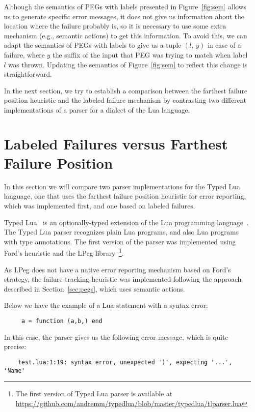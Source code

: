 \documentclass[3p,12pt,singlecolumn]{elsarticle}
\newcommand{\Tup}[2]{(#1,\,#2)}
\begin{document}
Although the semantics of PEGs with labels presented in
Figure~\ref{fig:sem} allows us to generate specific error
messages, it does not give us information about the location
where the failure probably is, so it is necessary to use some
extra mechanism (e.g., semantic actions) to get this information.
To avoid this, we can adapt the semantics of PEGs with labels
to give us a tuple $\Tup{l}{y}$ in case of a failure, where
$y$ the suffix of the input that PEG was trying to match
when label $l$ was thrown. Updating the semantics of Figure~\ref{fig:sem}
to reflect this change is straightforward.

In the next section, we try to establish a comparison between
the farthest failure position heuristic and the labeled failure mechanism
by contrasting two different implementations of a parser for a dialect of
the Lua language.


\section{Labeled Failures versus Farthest Failure Position}
\label{sec:labelsfft}

In this section we will compare two parser implementations for
the Typed Lua language, one that uses the farthest failure
position heuristic for error reporting, which was implemented
first, and one based on labeled failures.

Typed Lua~\cite{maidl2014typedlua} is an optionally-typed
extension of the Lua programming language~\cite{lua}.
The Typed Lua parser recognizes plain Lua programs, and
also Lua programs with type annotations. The first version
of the parser was implemented using Ford's
heuristic and the LPeg library~\footnote{The first version of Typed Lua parser is available at
\url{https://github.com/andremm/typedlua/blob/master/typedlua/tlparser.lua}}.

As LPeg does not have a native error reporting mechanism based
on Ford's strategy, the failure tracking heuristic was implemented
following the approach described in Section~\ref{sec:pegs},
which uses semantic actions.

Below we have the example of a Lua statement with a syntax error:
\begin{verbatim}
     a = function (a,b,) end
\end{verbatim}

In this case, the parser gives us the following error message,
which is quite precise:
\begin{verbatim}
    test.lua:1:19: syntax error, unexpected ')', expecting '...', 'Name'
\end{verbatim}
\end{document}
